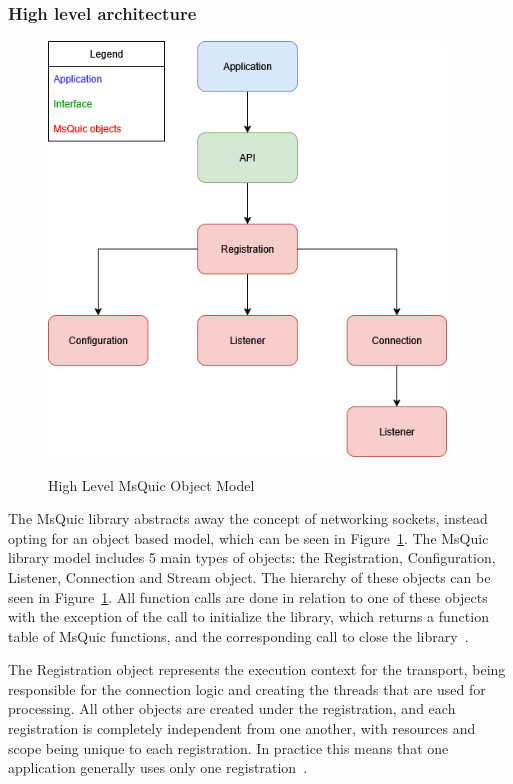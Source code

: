 \documentclass[english, 12pt, a4paper, elec, utf8, a-2b, online]{aaltothesis}
\begin{document}
\subsubsection{High level architecture}

\begin{figure}[h]
	\centering
	\includegraphics[alt={Block diagram of the high level object model of the MsQuic library, including relationships}, height=11cm]{./images/msquic_architecture.png}
	\caption{High Level MsQuic Object Model}
	\label{fig:msquic_arch}
\end{figure}

The MsQuic library abstracts away the concept of networking sockets, instead opting
for an object based model, which can be seen in Figure~\ref{fig:msquic_arch}. The
MsQuic library model includes 5 main types of objects: the Registration, Configuration,
Listener, Connection and Stream object. The hierarchy of these objects can be seen
in Figure~\ref{fig:msquic_arch}. All function calls are done in relation to one of
these objects with the exception of the call to initialize the library, which returns
a function table of MsQuic functions, and the corresponding call to close the library~\cite{msquic_docs}.

The Registration object represents the execution context for the transport, being
responsible for the connection logic and creating the threads that are used for
processing. All other objects are created under the registration, and each registration
is completely independent from one another, with resources and scope being
unique to each registration. In practice this means that one application generally
uses only one registration~\cite{msquic_docs}.
\end{document}
